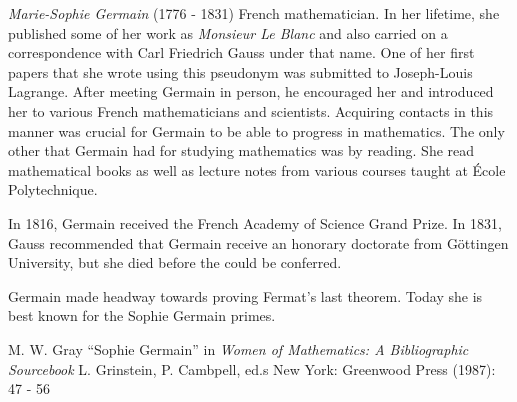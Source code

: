 \documentclass[12pt]{article}
\begin{document}
\emph{Marie-Sophie Germain} (1776 - 1831) French mathematician. In her lifetime, she published some of her work as \emph{Monsieur Le Blanc} and also carried on a correspondence with Carl Friedrich Gauss under that name. One of her first papers that she wrote using this pseudonym was submitted to Joseph-Louis Lagrange. After meeting Germain in person, he encouraged her and introduced her to various French mathematicians and scientists. Acquiring contacts in this manner was crucial for Germain to be able to progress in mathematics. The only other  that Germain had for studying mathematics was by reading. She read mathematical books as well as lecture notes from various courses taught at \'{E}cole Polytechnique.

In 1816, Germain received the French Academy of Science Grand Prize.  In 1831, Gauss recommended that Germain receive an honorary doctorate from G\"{o}ttingen University, but she died before the  could be conferred.

Germain made headway towards proving Fermat's last theorem. Today she is best known for the Sophie Germain primes.

\begin{thebibliography}{1}
 M. W. Gray ``Sophie Germain'' in {\it Women of Mathematics: A Bibliographic Sourcebook} L. Grinstein, P. Cambpell, ed.s New York: Greenwood Press (1987): 47 - 56
\end{thebibliography}
\end{document}
